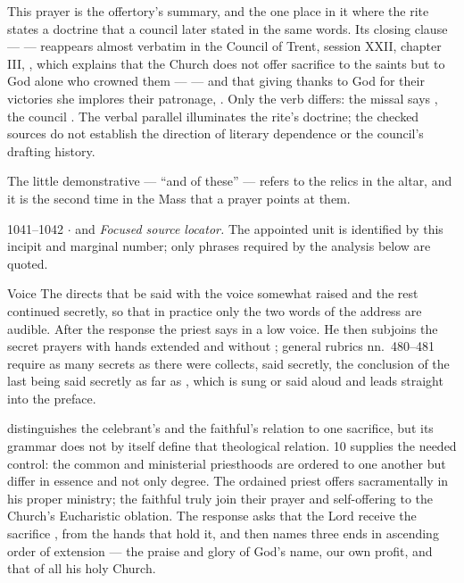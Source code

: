 This prayer is the offertory's summary, and the one place in it where the rite
states a doctrine that a council later stated in the same words. Its closing
clause ---  --- reappears almost verbatim in the Council of
Trent, session XXII, chapter III, ,
which explains that the Church does not offer sacrifice to the saints but to
God alone who crowned them ---  --- and that giving thanks to God for their
victories she implores their patronage, . Only the verb differs:
the missal says , the council . The verbal
parallel illuminates the rite's doctrine; the checked sources do not establish
the direction of literary dependence or the council's drafting history.

The little demonstrative  --- ``and of these'' --- refers
to the relics in the altar, and it is the second time in the Mass that a prayer
points at them.

\begin{appointed}{1041--1042 $\cdot$  and }
\textit{Focused source locator.} The appointed unit is identified by this incipit and marginal number; only phrases required by the analysis below are quoted.
\end{appointed}

\begin{rubricnote}{Voice}
The  directs that  be said with
the voice somewhat raised and the rest continued secretly, so that in practice
only the two words of the address are audible. After the response the priest
says  in a low voice. He then subjoins the secret prayers with
hands extended and without ; general rubrics nn.~480--481
require as many secrets as there were collects, said secretly, the conclusion
of the last being said secretly as far as , which is sung or said aloud and leads straight into the preface.
\end{rubricnote}

 distinguishes the celebrant's and the
faithful's relation to one sacrifice, but its grammar does not by itself define
that theological relation.  10 supplies the needed control:
the common and ministerial priesthoods are ordered to one another but differ in
essence and not only degree. The ordained priest offers sacramentally in his
proper ministry; the faithful truly join their prayer and self-offering to the
Church's Eucharistic oblation. The response asks
that the Lord receive the sacrifice , from the hands
that hold it, and then names three ends in ascending order of extension --- the
praise and glory of God's name, our own profit, and that of all his holy
Church.

